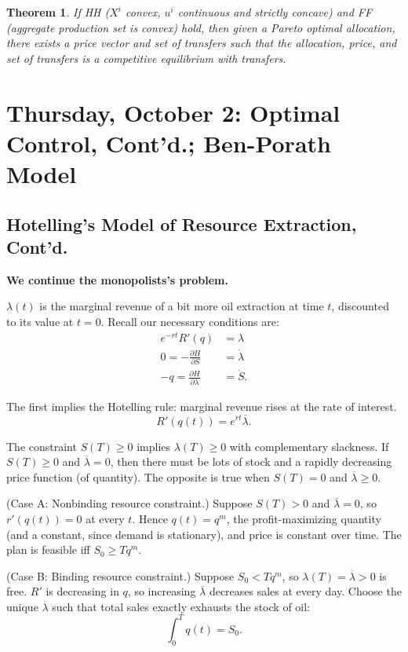 \documentclass{tufte-handout}
\newtheorem{thm}{Theorem}[subsection]
\theoremstyle{definition}
\begin{document}
\begin{thm}
	If HH ($X^i$ convex, $u^i$ continuous and strictly concave) and FF (aggregate production set is convex) hold, then given a Pareto optimal allocation, there exists a price vector and set of transfers such that the allocation, price, and set of transfers is a competitive equilibrium with transfers.
\end{thm}

\section{Thursday, October 2: Optimal Control, Cont'd.; Ben-Porath Model}
\subsection{Hotelling's Model of Resource Extraction, Cont'd.}

\textbf{We continue the monopolists's problem.}

$\lambda(t)$ is the marginal revenue of a bit more oil extraction at time $t$, discounted to its value at $t=0$. Recall our necessary conditions are:
\begin{align*}
	e^{-rt} R'(q) &=  \lambda \\
	0= -\frac{\partial H}{\partial S}  &= \dot{\lambda} \\
		-q = \frac{\partial H}{\partial \lambda}  &= \dot{S}
.\end{align*}

The first implies the Hotelling rule: marginal revenue rises at the rate of interest. \[
	R'(q(t)) = e^{rt} \overline{\lambda}
.\] 

The constraint $S(T) \ge 0$ implies $\lambda(T) \ge 0$ with complementary slackness. If $S\left( T \right) \ge 0$ and $\overline{\lambda} = 0$, then there must be lots of stock and a rapidly decreasing price function (of quantity). The opposite is true when $S(T) = 0$ and $\overline{\lambda} \ge 0$.

(Case A: Nonbinding resource constraint.) Suppose $S(T) > 0$ and $\overline{\lambda} = 0$, so $r'(q(t)) = 0$ at every $t$. Hence $q(t) = q^m$, the profit-maximizing quantity (and a constant, since demand is stationary), and price is constant over time. The plan is feasible iff $S_0 \ge Tq^m$.

(Case B: Binding resource constraint.) Suppose $S_0 < Tq^m$, so $\lambda(T) = \overline{\lambda} > 0$ is free. $R'$ is decreasing in $q$, so increasing $\overline{\lambda}$ decreases sales at every day. Choose the unique $\overline{\lambda}$ such that total sales exactly exhausts the stock of oil: \[
	\int_{0}^{T} q(t) = S_0 
.\] 
\end{document}
